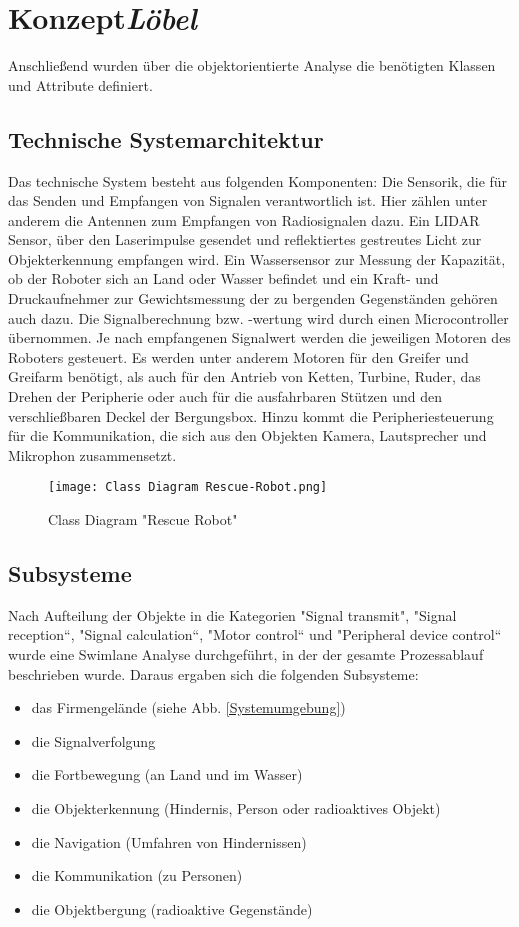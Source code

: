 \section{Konzept\hfill\textnormal{\emph{Löbel}}}
Anschließend wurden über die objektorientierte Analyse die benötigten Klassen und Attribute definiert. 

\subsection{Technische Systemarchitektur}
Das technische System besteht aus folgenden Komponenten: Die Sensorik, die für das Senden und Empfangen von Signalen verantwortlich ist. Hier zählen unter anderem die Antennen zum Empfangen von Radiosignalen dazu. Ein LIDAR Sensor, über den Laserimpulse gesendet und reflektiertes gestreutes Licht zur Objekterkennung empfangen wird. Ein Wassersensor zur Messung der Kapazität, ob der Roboter sich an Land oder Wasser befindet und ein Kraft- und Druckaufnehmer zur Gewichtsmessung der zu bergenden Gegenständen gehören auch dazu. Die Signalberechnung bzw. -wertung wird durch einen Microcontroller übernommen. Je nach empfangenen Signalwert werden die jeweiligen Motoren des Roboters gesteuert. Es werden unter anderem Motoren für den Greifer und Greifarm benötigt, als auch für den Antrieb von Ketten, Turbine, Ruder, das Drehen der Peripherie oder auch für die ausfahrbaren Stützen und den verschließbaren Deckel der Bergungsbox. Hinzu kommt die Peripheriesteuerung für die Kommunikation, die sich aus den Objekten Kamera, Lautsprecher und Mikrophon zusammensetzt. 

\begin{figure}[H]
  \centering\texttt{[image: Class Diagram Rescue-Robot.png]}
  \caption{Class Diagram "Rescue Robot"}
  \label{ClassDiagram}
\end{figure}

\subsection{Subsysteme}
Nach Aufteilung der Objekte in die Kategorien "Signal transmit", "Signal reception“, "Signal calculation“, "Motor control“ und "Peripheral device control“ wurde eine Swimlane Analyse durchgeführt, in der der gesamte Prozessablauf beschrieben wurde. Daraus ergaben sich die folgenden Subsysteme: 

\begin{itemize}
\item das Firmengelände (siehe Abb. \ref{Systemumgebung})
\item die Signalverfolgung
\item die Fortbewegung (an Land und im Wasser)
\item die Objekterkennung (Hindernis, Person oder radioaktives Objekt)
\item die Navigation (Umfahren von Hindernissen)
\item die Kommunikation (zu Personen)
\item die Objektbergung (radioaktive Gegenstände)
\end{itemize}

